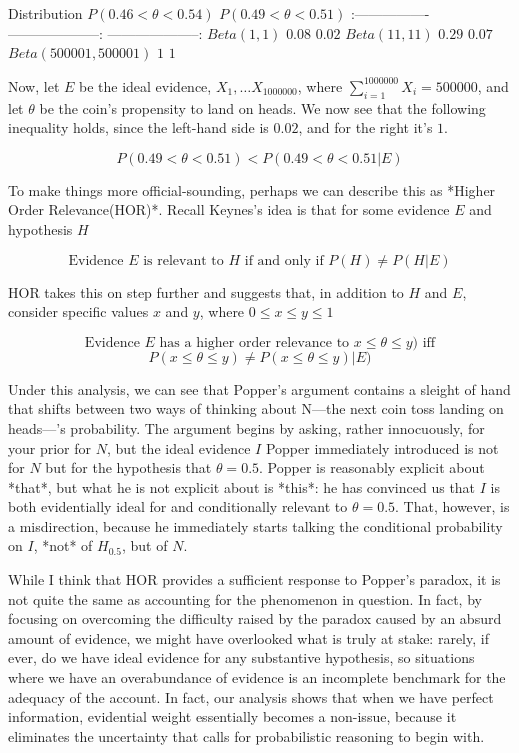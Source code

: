 \textbar{} Distribution \textbar{} \(P(0.46<\theta<0.54)\) \textbar{}
\(P(0.49<\theta<0.51)\) \textbar{} \textbar{} :----------------
\textbar{} --------------------: \textbar{} --------------------:
\textbar{} \textbar{} \(Beta(1,1)\) \textbar{} \(0.08\) \textbar{}
\(0.02\) \textbar{} \textbar{} \(Beta(11,11)\) \textbar{} \(0.29\)
\textbar{} \(0.07\) \textbar{} \textbar{} \(Beta(500001,500001)\)
\textbar{} \(1\) \textbar{} \(1\) \textbar{}

Now, let \(E\) be the ideal evidence, \(X_1,…X_{1000000}\), where
\(\sum_{i=1}^{1000000}X_i = 500000\), and let \(\theta\) be the coin's
propensity to land on heads. We now see that the following inequality
holds, since the left-hand side is \(0.02\), and for the right it's
\(1\).

\[P(0.49<\theta<0.51) <  P(0.49<\theta<0.51|E)\]

To make things more official-sounding, perhaps we can describe this as
*Higher Order Relevance(HOR)*. Recall Keynes's idea is that for some
evidence \(E\) and hypothesis \(H\)

\[\text{Evidence $E$ is relevant to $H$ if and only if }P(H) \neq P(H|E)\]

HOR takes this on step further and suggests that, in addition to \(H\)
and \(E\), consider specific values \(x\) and \(y\), where
\(0 \leq x \leq y \leq 1\)

\[\text{Evidence $E$ has a higher order relevance to $x\leq \theta \leq y)$ iff}\]
\[P(x\leq \theta \leq y) \neq P(x\leq \theta \leq y)|E)\]

Under this analysis, we can see that Popper's argument contains a
sleight of hand that shifts between two ways of thinking about N---the
next coin toss landing on heads---'s probability. The argument begins by
asking, rather innocuously, for your prior for \(N\), but the ideal
evidence \(I\) Popper immediately introduced is not for \(N\) but for
the hypothesis that \(\theta = 0.5\). Popper is reasonably explicit
about *that*, but what he is not explicit about is *this*: he has
convinced us that \(I\) is both evidentially ideal for and conditionally
relevant to \(\theta = 0.5\). That, however, is a misdirection, because
he immediately starts talking the conditional probability on \(I\),
*not* of \(H_{0.5}\), but of \(N\).

While I think that HOR provides a sufficient response to Popper's
paradox, it is not quite the same as accounting for the phenomenon in
question. In fact, by focusing on overcoming the difficulty raised by
the paradox caused by an absurd amount of evidence, we might have
overlooked what is truly at stake: rarely, if ever, do we have ideal
evidence for any substantive hypothesis, so situations where we have an
overabundance of evidence is an incomplete benchmark for the adequacy of
the account. In fact, our analysis shows that when we have perfect
information, evidential weight essentially becomes a non-issue, because
it eliminates the uncertainty that calls for probabilistic reasoning to
begin with.

